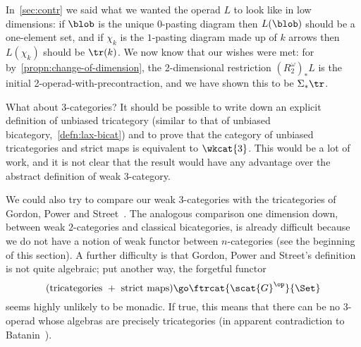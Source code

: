 In~\ref{sec:contr} we said what we wanted the operad $L$ to look like
in low dimensions: if $\blob$ is the unique $0$-pasting diagram then
$L(\blob)$%
%
%
should be a one-element set, and if $\chi_k$ is the $1$-pasting diagram made
up of $k$ arrows then $L(\chi_k)$ should be $\tr(k)$.  We now know that our
wishes were met: for by~\ref{propn:change-of-dimension}, the 2-dimensional
restriction $(R^\omega_2)_* L$ is the initial 2-operad-with-precontraction,
and we have shown this to be $\Sigma_* \tr$.

%
%
%
%
What about $3$-categories?  It should be possible to write down an explicit
definition of unbiased tricategory (similar to that of unbiased
bicategory,~\ref{defn:lax-bicat}) and to prove that the category of
unbiased tricategories and strict maps is equivalent to $\wkcat{3}$.  This
would be a lot of work, and it is not clear that the result would have any
advantage over the abstract definition of weak $3$-category.  

We could also try to compare our weak $3$-categories with the tricategories 
of Gordon,%
%
%
Power and Street~\cite{GPS}.  The analogous comparison one dimension down,
between weak $2$-categories and classical bicategories, is already
difficult because we do not have a notion of weak functor between
$n$-categories (see the beginning of this section).  A further difficulty
is that Gordon, Power and Street's definition is not quite algebraic;%
%
%
put
another way, the forgetful functor
\[
(\textrm{tricategories } + \textrm{ strict maps})
\go
\ftrcat{\scat{G}^\op}{\Set}
\]
seems highly unlikely to be monadic.  If true, this means that there can be
no 3-operad whose algebras are precisely tricategories (in apparent
contradiction to Batanin~\cite[p.~94]{BatMGC}).%
%
%
 

